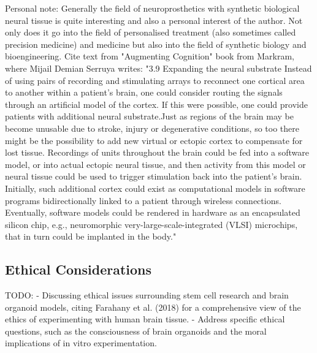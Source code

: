 \documentclass[10pt]{article}
\begin{document}
\begin{sloppypar}
  Personal note: Generally the field of neuroprosthetics with synthetic biological neural tissue is quite interesting and also a personal interest of the author. Not only does it go into the field of personalised treatment (also sometimes called precision medicine) and medicine but also into the field of synthetic biology and bioengineering. Cite text from "Augmenting Cognition" book from Markram, where Mijail Demian Serruya writes: "3.9 Expanding the neural substrate  Instead of using pairs of recording and stimulating arrays to reconnect one cortical area to another within a patient’s brain, one could  consider routing the signals through an artificial model of the cortex.  If this were possible, one could provide patients with additional neural substrate.Just as regions of the brain may be become unusable due  to stroke, injury or degenerative conditions, so too there might be the  possibility to add new virtual or ectopic cortex to compensate for lost  tissue. Recordings of units throughout the brain could be fed into a  software model, or into actual ectopic neural tissue, and then activity from this model or neural tissue could be used to trigger stimulation back into the patient’s brain. Initially, such additional cortex could exist as computational models in software programs  bidirectionally linked to a patient through wireless connections. Eventually, software models could be rendered in hardware as an encapsulated silicon chip, e.g., neuromorphic very-large-scale-integrated  (VLSI) microchips, that in turn could be implanted in the body."

  \subsection{Ethical Considerations}
  \label{sec:ethical-considerations}

  TODO:
  - Discussing ethical issues surrounding stem cell research and brain organoid models, citing Farahany et al. (2018) for a comprehensive view of the ethics of experimenting with human brain tissue.
  - Address specific ethical questions, such as the consciousness of brain organoids and the moral implications of in vitro experimentation.


\end{sloppypar}
\end{document}

